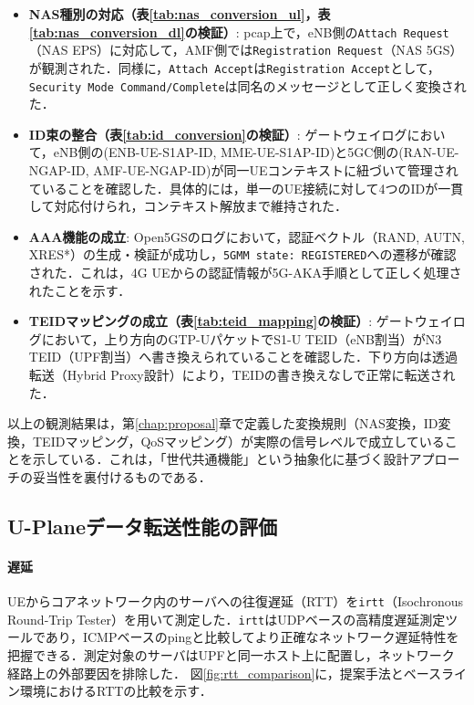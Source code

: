 \begin{itemize}
    \item \textbf{NAS種別の対応（表\ref{tab:nas_conversion_ul}，表\ref{tab:nas_conversion_dl}の検証）}:
    pcap上で，eNB側の\texttt{Attach Request}（NAS EPS）に対応して，AMF側では\texttt{Registration Request}（NAS 5GS）が観測された．同様に，\texttt{Attach Accept}は\texttt{Registration Accept}として，\texttt{Security Mode Command/Complete}は同名のメッセージとして正しく変換された．

    \item \textbf{ID束の整合（表\ref{tab:id_conversion}の検証）}:
    ゲートウェイログにおいて，eNB側の(ENB-UE-S1AP-ID, MME-UE-S1AP-ID)と5GC側の(RAN-UE-NGAP-ID, AMF-UE-NGAP-ID)が同一UEコンテキストに紐づいて管理されていることを確認した．具体的には，単一のUE接続に対して4つのIDが一貫して対応付けられ，コンテキスト解放まで維持された．

    \item \textbf{AAA機能の成立}:
    Open5GSのログにおいて，認証ベクトル（RAND, AUTN, XRES*）の生成・検証が成功し，\texttt{5GMM state: REGISTERED}への遷移が確認された．これは，4G UEからの認証情報が5G-AKA手順として正しく処理されたことを示す．

    \item \textbf{TEIDマッピングの成立（表\ref{tab:teid_mapping}の検証）}:
    ゲートウェイログにおいて，上り方向のGTP-UパケットでS1-U TEID（eNB割当）がN3 TEID（UPF割当）へ書き換えられていることを確認した．下り方向は透過転送（Hybrid Proxy設計）により，TEIDの書き換えなしで正常に転送された．
\end{itemize}

以上の観測結果は，第\ref{chap:proposal}章で定義した変換規則（NAS変換，ID変換，TEIDマッピング，QoSマッピング）が実際の信号レベルで成立していることを示している．これは，「世代共通機能」という抽象化に基づく設計アプローチの妥当性を裏付けるものである．

\subsection{U-Planeデータ転送性能の評価}
\paragraph{遅延}
UEからコアネットワーク内のサーバへの往復遅延（RTT）を\texttt{irtt}（Isochronous Round-Trip Tester）を用いて測定した．\texttt{irtt}はUDPベースの高精度遅延測定ツールであり，ICMPベースのpingと比較してより正確なネットワーク遅延特性を把握できる．測定対象のサーバはUPFと同一ホスト上に配置し，ネットワーク経路上の外部要因を排除した．
図\ref{fig:rtt_comparison}に，提案手法とベースライン環境におけるRTTの比較を示す．

